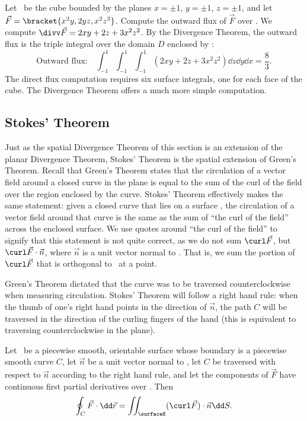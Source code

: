 \begin{example}\label{ex_divthm_space4}%
Let \surfaceS\ be the cube bounded by the planes $x=\pm 1$, $y=\pm 1$, $z=\pm 1$, and let $\vec F =\bracket{x^2y,2yz,x^2z^3}$. Compute the outward flux of $\vec F$ over \surfaceS.
\solution
We compute $\divv \vec F = 2xy+2z+3x^2z^2$. By the Divergence Theorem, the outward flux is the triple integral over the domain $D$ enclosed by \surfaceS:
\[
\text{Outward flux:}
\quad \int_{-1}^1\int_{-1}^1\int_{-1}^1(2xy+2z+3x^2z^2)\dd z\dd y\dd x = \frac83.
\]
The direct flux computation requires six surface integrals, one for each face of the cube. The Divergence Theorem offers a much more simple computation.
\end{example}

\subsection{Stokes' Theorem}

Just as the spatial Divergence Theorem of this section is an extension of the planar Divergence Theorem, Stokes' Theorem is the spatial extension of Green's Theorem. Recall that Green's Theorem states that the circulation of a vector field around a closed curve in the plane is equal to the sum of the curl of the field over the region enclosed by the curve. Stokes' Theorem effectively makes the same statement: given a closed curve that lies on a surface \surfaceS, the circulation of a vector field around that curve is the same as the sum of ``the curl of the field'' across the enclosed surface. We use quotes around ``the curl of the field'' to signify that this statement is not quite correct, as we do not sum $\curl \vec F$, but $\curl \vec F\cdot\vec n$, where $\vec n$ is a unit vector normal to \surfaceS. That is, we sum the portion of $\curl \vec F$ that is orthogonal to \surfaceS\ at a point.

Green's Theorem dictated that the curve was to be traversed counterclockwise when measuring circulation. Stokes' Theorem will follow a right hand rule: when the thumb of one's right hand points in the direction of $\vec n$, the path $C$ will be traversed in the direction of the curling fingers of the hand (this is equivalent to traversing counterclockwise in the plane).

\begin{theorem}\label{thm:stokes_thm}%
Let \surfaceS\ be a piecewise smooth, orientable surface whose boundary is a piecewise smooth curve $C$, let $\vec n$ be a unit vector normal to \surfaceS, let $C$ be traversed with respect to $\vec n$ according to the right hand rule, and let the components of $\vec F$ have continuous first partial derivatives over \surfaceS. Then
\[\oint_C \vec F\cdot\dd\vec r = \iint_{\surfaceS} (\curl\vec F)\cdot \vec n\dd S.\]
\end{theorem}

